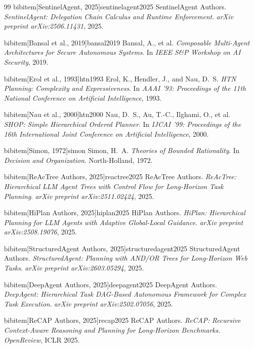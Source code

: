 \begin{thebibliography}{99}
bibitem[SentinelAgent, 2025]{sentinelagent2025}
 SentinelAgent Authors. \newblock \emph{SentinelAgent: Delegation Chain Calculus and Runtime Enforcement}.
 \newblock \emph{arXiv preprint arXiv:2506.11431}, 2025.

bibitem[Bansal et al., 2019]{bansal2019}
 Bansal, A., et al. \newblock \emph{Composable Multi-Agent Architectures for Secure Autonomous Systems}.
 \newblock In \emph{IEEE S\&P Workshop on AI Security}, 2019.

bibitem[Erol et al., 1993]{htn1993}
 Erol, K., Hendler, J., and Nau, D.~S. \newblock \emph{HTN Planning: Complexity and Expressiveness}.
 \newblock In \emph{AAAI '93: Proceedings of the 11th National Conference on Artificial Intelligence}, 1993.

bibitem[Nau et al., 2000]{htn2000}
 Nau, D.~S., Au, T.-C., Ilghami, O., et al. \newblock \emph{SHOP: Simple Hierarchical Ordered Planner}.
 \newblock In \emph{IJCAI '99: Proceedings of the 16th International Joint Conference on Artificial Intelligence}, 2000.

bibitem[Simon, 1972]{simon}
 Simon, H.~A. \newblock \emph{Theories of Bounded Rationality}.
 \newblock In \emph{Decision and Organization}. North-Holland, 1972.

bibitem[ReAcTree Authors, 2025]{reactree2025}
 ReAcTree Authors. \newblock \emph{ReAcTree: Hierarchical LLM Agent Trees with Control Flow for Long-Horizon Task Planning}.
 \newblock \emph{arXiv preprint arXiv:2511.02424}, 2025.

bibitem[HiPlan Authors, 2025]{hiplan2025}
 HiPlan Authors. \newblock \emph{HiPlan: Hierarchical Planning for LLM Agents with Adaptive Global-Local Guidance}.
 \newblock \emph{arXiv preprint arXiv:2508.19076}, 2025.

bibitem[StructuredAgent Authors, 2025]{structuredagent2025}
 StructuredAgent Authors. \newblock \emph{StructuredAgent: Planning with AND/OR Trees for Long-Horizon Web Tasks}.
 \newblock \emph{arXiv preprint arXiv:2603.05294}, 2025.

bibitem[DeepAgent Authors, 2025]{deepagent2025}
 DeepAgent Authors. \newblock \emph{DeepAgent: Hierarchical Task DAG-Based Autonomous Framework for Complex Task Execution}.
 \newblock \emph{arXiv preprint arXiv:2502.07056}, 2025.

bibitem[ReCAP Authors, 2025]{recap2025}
 ReCAP Authors. \newblock \emph{ReCAP: Recursive Context-Aware Reasoning and Planning for Long-Horizon Benchmarks}.
 \newblock \emph{OpenReview}, ICLR 2025.


\end{thebibliography}
